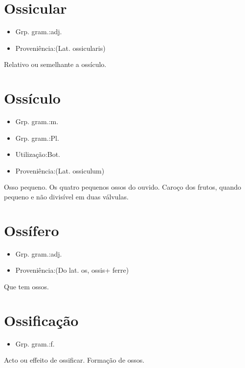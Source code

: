 \section{Ossicular}
\begin{itemize}
\item {Grp. gram.:adj.}
\end{itemize}
\begin{itemize}
\item {Proveniência:(Lat. \textunderscore ossicularis\textunderscore )}
\end{itemize}
Relativo ou semelhante a ossículo.
\section{Ossículo}
\begin{itemize}
\item {Grp. gram.:m.}
\end{itemize}
\begin{itemize}
\item {Grp. gram.:Pl.}
\end{itemize}
\begin{itemize}
\item {Utilização:Bot.}
\end{itemize}
\begin{itemize}
\item {Proveniência:(Lat. \textunderscore ossiculum\textunderscore )}
\end{itemize}
Osso pequeno.
Os quatro pequenos ossos do ouvido.
Caroço dos frutos, quando pequeno e não divisível em duas válvulas.
\section{Ossífero}
\begin{itemize}
\item {Grp. gram.:adj.}
\end{itemize}
\begin{itemize}
\item {Proveniência:(Do lat. \textunderscore os\textunderscore , \textunderscore ossis\textunderscore  + \textunderscore ferre\textunderscore )}
\end{itemize}
Que tem ossos.
\section{Ossificação}
\begin{itemize}
\item {Grp. gram.:f.}
\end{itemize}
Acto ou effeito de ossificar.
Formação de ossos.
